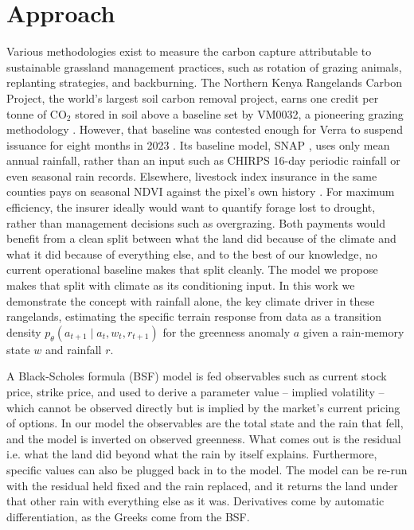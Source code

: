 \documentclass[letterpaper]{article} %
\begin{document}
\section{Approach}
Various methodologies exist to measure the carbon capture attributable to sustainable grassland management practices, such as rotation of grazing animals, replanting strategies, and backburning. The Northern Kenya Rangelands Carbon Project, the world's largest soil carbon removal project, earns one credit per tonne of CO$_2$ stored in soil above a baseline set by VM0032, a pioneering grazing methodology \citep{vm0032,verra2023}. However, that baseline was contested enough for Verra to suspend issuance for eight months in 2023 \citep{verra2023,si2023}. Its baseline model, SNAP \citep{ritchie2014,nkgcp_pd2016}, uses only mean annual rainfall, rather than an input such as CHIRPS 16-day periodic rainfall \citep{nkcp} or even seasonal rain records. Elsewhere, livestock index insurance in the same counties pays on seasonal NDVI against the pixel's own history \citep{ibli}. For maximum efficiency, the insurer ideally would want to quantify forage lost to drought, rather than management decisions such as overgrazing. Both payments would benefit from a clean split between what the land did because of the climate and what it did because of everything else, and to the best of our knowledge, no current operational baseline makes that split cleanly. The model we propose makes that split with climate as its conditioning input. In this work we demonstrate the concept with rainfall alone, the key climate driver in these rangelands, estimating the specific terrain response from data as a transition density $p_\theta(a_{t+1}\mid a_t, w_t, r_{t+1})$ for the greenness anomaly $a$ given a rain-memory state $w$ and rainfall $r$.

A Black-Scholes formula (BSF) model \citep{bs} is fed observables such as current stock price, strike price, and used to derive a parameter value -- implied volatility -- which cannot be observed directly but is implied by the market's current pricing of options. In our model the observables are the total state and the rain that fell, and the model is inverted on observed greenness. What comes out is the residual i.e. what the land did beyond what the rain by itself explains. Furthermore, specific values can also be plugged back in to the model. The model can be re-run with the residual held fixed and the rain replaced, and it returns the land under that other rain with everything else as it was. Derivatives come by automatic differentiation, as the Greeks come from the BSF.
\end{document}
